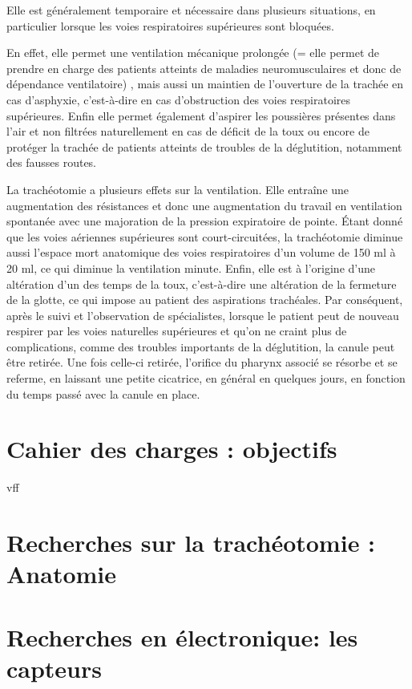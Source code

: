 \documentclass [11pt]{article}
\begin{document}
Elle est généralement temporaire et nécessaire dans plusieurs situations, en particulier lorsque les voies respiratoires supérieures sont bloquées.

En effet, elle permet une ventilation mécanique prolongée (= elle permet de prendre en charge des patients atteints de maladies neuromusculaires et donc de dépendance ventilatoire) , mais aussi un maintien de l'ouverture de la trachée en cas d'asphyxie, c'est-à-dire en cas d'obstruction des voies respiratoires supérieures. Enfin elle permet également d'aspirer les poussières présentes dans l'air et non filtrées naturellement en cas de déficit de la toux ou encore de protéger la trachée de patients atteints de troubles de la déglutition, notamment des fausses routes. 


La trachéotomie a plusieurs effets sur la ventilation. Elle entraîne une augmentation des résistances et donc une augmentation du travail en ventilation spontanée avec une majoration de la pression expiratoire de pointe.
Étant donné que les voies aériennes supérieures sont court-circuitées, la trachéotomie diminue aussi l’espace mort anatomique des voies respiratoires d’un volume de 150 ml à 20 ml, ce qui diminue la ventilation minute. 
Enfin, elle est à l’origine d’une altération d’un des temps de la toux, c'est-à-dire une altération de la fermeture de la glotte, ce qui impose au patient des aspirations trachéales.
Par conséquent, après le suivi et l’observation de spécialistes, lorsque le patient peut de nouveau respirer par les voies naturelles supérieures et qu’on ne craint plus de complications, comme des troubles importants de la déglutition, la canule peut être retirée.
Une fois celle-ci retirée, l’orifice du pharynx associé se résorbe et se referme, en laissant une petite cicatrice, en général en quelques jours, en fonction du temps passé avec la canule en place.


\newpage
\part{Cahier des charges : objectifs}
vff
\newpage
\part{Recherches sur la trachéotomie : Anatomie}

\newpage
\part{Recherches en électronique: les capteurs }
\end{document}

